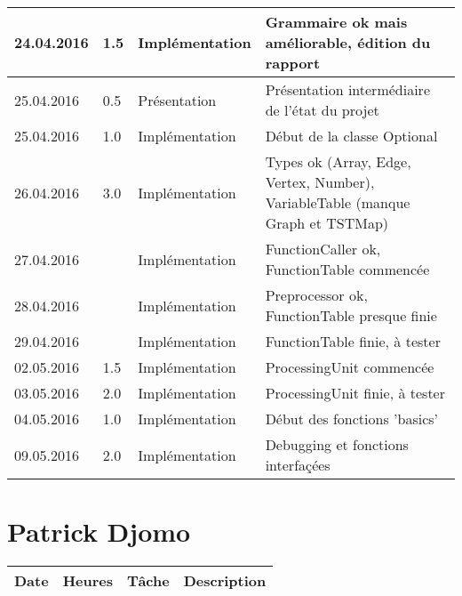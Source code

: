\documentclass[french]{article}
\begin{document}
\begin{tabular}{p{}|p{}|p{}|p{}}
		24.04.2016 & 1.5 & Implémentation & Grammaire ok mais améliorable, édition du rapport\\ 
		\hline
		25.04.2016 & 0.5 & Présentation & Présentation intermédiaire de l'état du projet\\
		25.04.2016 & 1.0 & Implémentation & Début de la classe Optional\\
		26.04.2016 & 3.0 & Implémentation & Types ok (Array, Edge, Vertex, Number), VariableTable (manque Graph et TSTMap)\\
		27.04.2016 & & Implémentation & FunctionCaller ok, FunctionTable commencée\\
		28.04.2016 & & Implémentation & Preprocessor ok, FunctionTable presque finie\\
		29.04.2016 & & Implémentation & FunctionTable finie, à tester\\
		\hline
		02.05.2016 & 1.5 & Implémentation & ProcessingUnit commencée\\
		03.05.2016 & 2.0 & Implémentation & ProcessingUnit finie, à tester\\
		04.05.2016 & 1.0 & Implémentation & Début des fonctions 'basics'\\
		\hline 
		09.05.2016 & 2.0 & Implémentation & Debugging et fonctions interfaçées\\
	\end{tabular}
	
	\section*{Patrick Djomo}
	\begin{tabular}{p{}|p{}|p{}|p{}}
		Date&Heures&Tâche&Description\\
		\hline
	\end{tabular}
	
\end{document}
